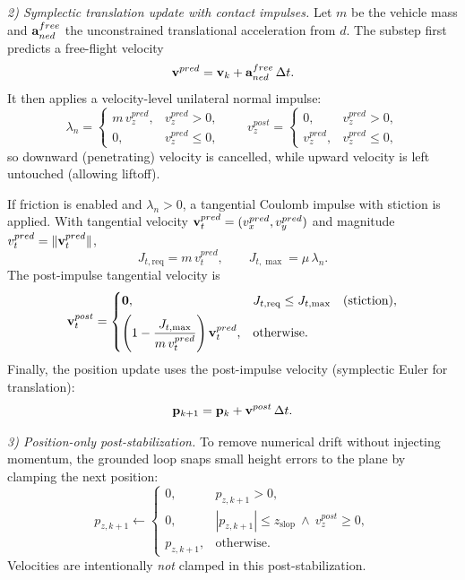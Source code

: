 \emph{2) Symplectic translation update with contact impulses.}
Let \(m\) be the vehicle mass and \(\mathbf{a}^{free}_{ned}\) the unconstrained translational acceleration from \(d\). The substep first predicts a free-flight velocity
\begin{equation}
  \mathbf{v}^{pred} = \mathbf{v}_k + \mathbf{a}^{free}_{ned}\,\Delta t.
\end{equation}
It then applies a velocity-level unilateral normal impulse:
\begin{equation}
  \lambda_n =
  \begin{cases}
    m\,v^{pred}_{z}, & v^{pred}_{z} > 0,\\
    0, & v^{pred}_{z} \le 0,
  \end{cases}
  \qquad
  v^{post}_{z} =
  \begin{cases}
    0, & v^{pred}_{z} > 0,\\
    v^{pred}_{z}, & v^{pred}_{z} \le 0,
  \end{cases}
\end{equation}
so downward (penetrating) velocity is cancelled, while upward velocity is left untouched (allowing liftoff).

If friction is enabled and \(\lambda_n>0\), a tangential Coulomb impulse with stiction is applied. With tangential velocity \(\mathbf{v}^{pred}_{t}=(v^{pred}_{x},v^{pred}_{y})\) and magnitude \(v^{pred}_{t}=\|\mathbf{v}^{pred}_{t}\|\),
\begin{equation}
  J_{t,\mathrm{req}} = m\,v^{pred}_{t},\qquad J_{t,\max} = \mu\,\lambda_n.
\end{equation}
The post-impulse tangential velocity is
\begin{equation}
  \mathbf{v}^{post}_{t} =
  \begin{cases}
    \mathbf{0}, & J_{t,\mathrm{req}} \le J_{t,\max}\quad(\text{stiction}),\\[4pt]
    \left(1-\dfrac{J_{t,\max}}{m\,v^{pred}_{t}}\right)\mathbf{v}^{pred}_{t}, & \text{otherwise}.
  \end{cases}
\end{equation}
Finally, the position update uses the post-impulse velocity (symplectic Euler for translation):
\begin{equation}
  \mathbf{p}_{k+1} = \mathbf{p}_k + \mathbf{v}^{post}\,\Delta t.
\end{equation}

\emph{3) Position-only post-stabilization.}
To remove numerical drift without injecting momentum, the grounded loop snaps small height errors to the plane by clamping the next position:
\begin{equation}
  p_{z,k+1} \leftarrow
  \begin{cases}
    0, & p_{z,k+1}>0,\\
    0, & |p_{z,k+1}| \le z_{\mathrm{slop}}\ \wedge\ v^{post}_{z}\ge 0,\\
    p_{z,k+1}, & \text{otherwise}.
  \end{cases}
\end{equation}
Velocities are intentionally \emph{not} clamped in this post-stabilization.

